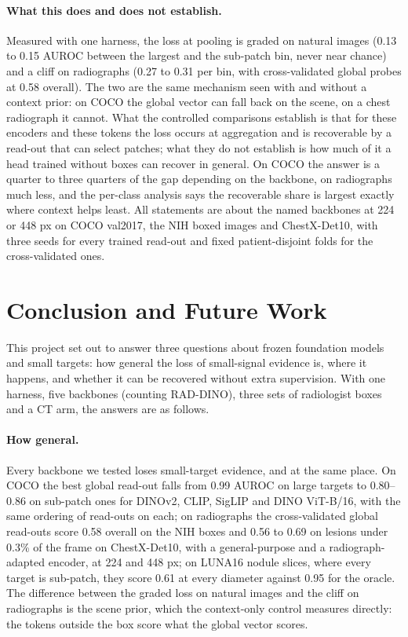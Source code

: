 \documentclass[10pt,letterpaper,twocolumn]{article}
\begin{document}
\paragraph{What this does and does not establish.}
Measured with one harness, the loss at pooling is graded on natural images (0.13 to 0.15 AUROC
between the largest and the sub-patch bin, never near chance) and a cliff on radiographs
(0.27 to 0.31 per bin, with cross-validated global probes at 0.58 overall). The two are the
same mechanism seen with and without a context prior: on COCO the global vector can fall back
on the scene, on a chest radiograph it cannot. What the controlled comparisons establish is
that for these encoders and these tokens the loss occurs at aggregation and is recoverable
by a read-out that can select patches; what they do not establish is how much of it a head
trained without boxes can recover in general. On COCO the answer is a quarter to three quarters
of the gap depending on the backbone, on radiographs much less, and the per-class
analysis says the recoverable share is largest exactly where context helps least. All
statements are about the named backbones at 224 or 448 px on COCO val2017, the NIH boxed
images and ChestX-Det10, with three seeds for every trained read-out and fixed patient-disjoint
folds for the cross-validated ones.

\section{Conclusion and Future Work}
\label{sec:plan}
This project set out to answer three questions about frozen foundation models and small
targets: how general the loss of small-signal evidence is, where it happens, and whether it
can be recovered without extra supervision. With one harness, five backbones (counting
RAD-DINO), three sets of radiologist boxes and a CT arm, the answers are as follows.

\paragraph{How general.}
Every backbone we tested loses small-target evidence, and at the same place. On COCO the best
global read-out falls from 0.99 AUROC on large targets to 0.80--0.86 on sub-patch ones for
DINOv2, CLIP, SigLIP and DINO ViT-B/16, with the same ordering of read-outs on each; on
radiographs the cross-validated global read-outs score 0.58 overall on the NIH boxes and 0.56
to 0.69 on lesions under 0.3\% of the frame on ChestX-Det10, with a general-purpose and a
radiograph-adapted encoder, at 224 and 448 px; on LUNA16 nodule slices, where every target
is sub-patch, they score 0.61 at every diameter against 0.95 for the oracle. The difference between the graded loss on
natural images and the cliff on radiographs is the scene prior, which the context-only
control measures directly: the tokens outside the box score what the global vector scores.
\end{document}
